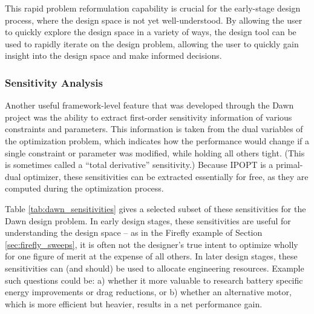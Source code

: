 This rapid problem reformulation capability is crucial for the early-stage design process, where the design space is not yet well-understood. By allowing the user to quickly explore the design space in a variety of ways, the design tool can be used to rapidly iterate on the design problem, allowing the user to quickly gain insight into the design space and make informed decisions.

\subsubsection*{Sensitivity Analysis}

Another useful framework-level feature that was developed through the Dawn project was the ability to extract first-order sensitivity information of various constraints and parameters. This information is taken from the dual variables of the optimization problem, which indicates how the performance would change if a single constraint or parameter was modified, while holding all others tight. (This is sometimes called a ``total derivative'' sensitivity.) Because IPOPT is a primal-dual optimizer, these sensitivities can be extracted essentially for free, as they are computed during the optimization process.

Table \ref{tab:dawn_sensitivities} gives a selected subset of these sensitivities for the Dawn design problem. In early design stages, these sensitivities are useful for understanding the design space -- as in the Firefly example of Section \ref{sec:firefly_sweeps}, it is often not the designer's true intent to optimize wholly for one figure of merit at the expense of all others. In later design stages, these sensitivities can (and should) be used to allocate engineering resources. Example such questions could be: a) whether it more valuable to research battery specific energy improvements or drag reductions, or b) whether an alternative motor, which is more efficient but heavier, results in a net performance gain.

